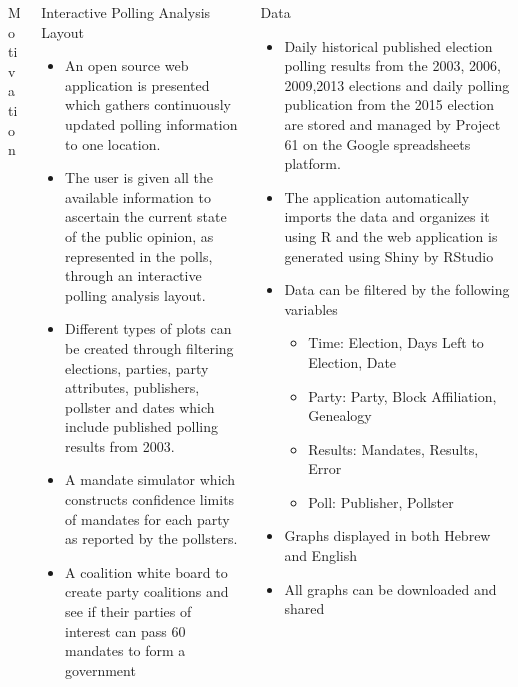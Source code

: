 \documentclass[final, hyperref={pdfpagelabels=false}]{beamer}
\begin{document}
\begin{frame}{}
\begin{columns}[t]
\begin{column}{.3\linewidth}
\begin{block}{Motivation}
\begin{itemize}
				\end{itemize}
			\end{block}
		\end{column}
		\begin{column}{.3\linewidth}			
			\begin{block}{Interactive Polling Analysis Layout} 
				 \begin{itemize}
					 \item An open source web application is presented which gathers continuously updated polling information to one location. 
					 \item The user is given all the available information to ascertain the current state of the public opinion, as represented in the polls, through an interactive polling analysis layout.
				 	\item Different types of plots can be created through filtering elections, parties, party attributes, publishers, pollster and dates which include published polling results from 2003.
				 	\item  A mandate simulator which constructs confidence limits of mandates for each party as reported by the pollsters.
				 	\item A coalition white board to create party coalitions and see if their parties of interest can pass 60 mandates to form a government
				 \end{itemize} 
			\end{block}
		\end{column}
		\begin{column}{.3\linewidth}
			\begin{block}{Data}
			\begin{itemize}
			\item Daily historical published election polling results from the 2003, 2006, 2009,2013 elections and daily polling publication from the 2015 election are stored and managed by Project 61 on the Google spreadsheets platform.
			\item The application automatically imports the data and organizes it using R and the web application is generated using Shiny by RStudio 
			\item Data can be filtered by the following variables
			\begin{itemize}
			\item Time: Election, Days Left to Election, Date
			\item Party: Party, Block Affiliation, Genealogy
			\item Results: Mandates, Results, Error
			\item Poll: Publisher, Pollster
			\end{itemize}
			\item Graphs displayed in both Hebrew and English
			\item All graphs can be downloaded and shared
			\end{itemize}
			 

\end{block}
\end{column}
\end{columns}
\end{frame}
\end{document}
